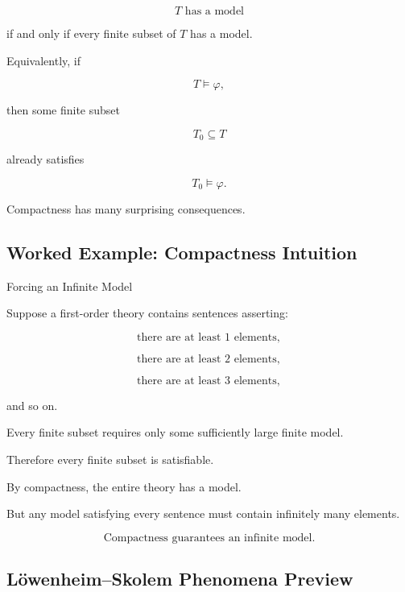 \[
\boxed{
T
\text{ has a model}
}
\]

if and only if every finite subset of \(T\) has a model.

Equivalently, if

\[
T\models\varphi,
\]

then some finite subset

\[
T_0\subseteq T
\]

already satisfies

\[
\boxed{
T_0\models\varphi.
}
\]

Compactness has many surprising consequences.

\subsection{Worked Example: Compactness Intuition}
\label{subsec:worked-compactness-intuition}

\begin{workedexamplebox}{Forcing an Infinite Model}

Suppose a first-order theory contains sentences asserting:

\[
\text{there are at least }1\text{ elements},
\]

\[
\text{there are at least }2\text{ elements},
\]

\[
\text{there are at least }3\text{ elements},
\]

and so on.

Every finite subset requires only some sufficiently large finite model.

Therefore every finite subset is satisfiable.

By compactness, the entire theory has a model.

But any model satisfying every sentence must contain infinitely many
elements.

\begin{answerbox}
\[
\boxed{
\text{Compactness guarantees an infinite model.}
}
\]
\end{answerbox}

\end{workedexamplebox}

\subsection{Löwenheim--Skolem Phenomena Preview}
\label{subsec:lowenheim-skolem-preview}

